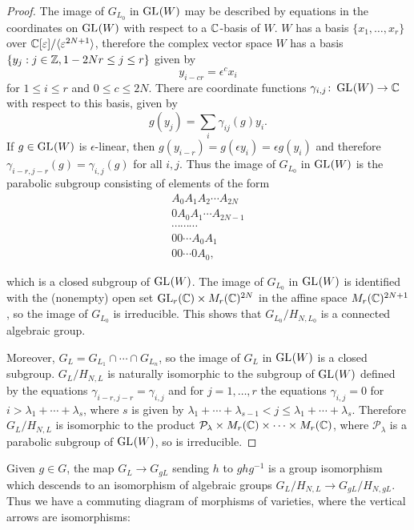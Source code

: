 \documentclass[a4paper, 11pt]{report}
\begin{document}
\begin{proof}
The image of $G_{L_0}$ in $\operatorname{GL}_{}(W)$ may be described by equations in the coordinates on $\operatorname{GL}_{}(W)$ with respect to a $\mathbb{C}$-basis of $W$. $W$ has a basis $\{x_1,\ldots,x_r\}$ over $\mathbb{C}[\varepsilon]/{\langle\varepsilon^{2N+1}\rangle}$, therefore the complex vector space $W$ has a basis $\{y_j:j\in\mathbb{Z},1-2Nr\le j\le r\}$ given by
\begin{equation*}
y_{i-cr} = \epsilon^c x_i
\end{equation*}
for $1\le i\le r$ and $0\le c\le 2N$. There are coordinate functions $\gamma_{i,j}\colon\operatorname{GL}_{}(W)\to\mathbb{C}$ with respect to this basis, given by
\begin{equation*}
g(y_j) = \sum_i \gamma_{ij}(g)y_i.
\end{equation*}
If $g\in\operatorname{GL}_{}(W)$ is $\epsilon$-linear, then $g(y_{i-r}) = g(\epsilon y_i) = \epsilon g(y_i)$ and therefore $\gamma_{i-r,j-r}(g) = \gamma_{i,j}(g)$ for all $i,j$. Thus the image of $G_{L_0}$ in $\operatorname{GL}_{}(W)$ is the parabolic subgroup consisting of elements of the form
\begin{align*}
A_0 A_1 A_2 \cdots A_{2N}\\
0 A_0 A_1 \cdots A_{2N-1}\\
\cdots \cdots \cdots\\
0 0 \cdots A_0 A_1\\
0 0 \cdots 0 A_0,
\end{align*}

which is a closed subgroup of $\operatorname{GL}_{}(W)$. The image of $G_{L_0}$ in $\operatorname{GL}_{}(W)$ is identified with the (nonempty) open set $\operatorname{GL}_{r}(\mathbb{C})\times M_r(\mathbb{C})^{2N}$ in the affine space $M_r(\mathbb{C})^{2N+1}$, so the image of $G_{L_0}$ is irreducible. This shows that $G_{L_0}/{H_{N,L_0}}$ is a connected algebraic group.

Moreover, $G_L = G_{L_1}\cap\cdots\cap G_{L_n}$, so the image of $G_L$ in $\operatorname{GL}_{}(W)$ is a closed subgroup. $G_L/{H_{N,L}}$ is naturally isomorphic to the subgroup of $\operatorname{GL}_{}(W)$ defined by the equations $\gamma_{i-r,j-r} = \gamma_{i,j}$ and for $j=1,\ldots,r$ the equations $\gamma_{i,j}=0$ for $i>\lambda_1+\cdots +\lambda_s$, where $s$ is given by $\lambda_1+\cdots +\lambda_{s-1}< j\le\lambda_1+\cdots +\lambda_s$. Therefore $G_L/{H_{N,L}}$ is isomorphic to the product $\mathcal{P}_\lambda\times M_r(\mathbb{C})\times\cdots\times M_r(\mathbb{C})$, where $\mathcal{P}_\lambda$ is a parabolic subgroup of $\operatorname{GL}_{}(W)$, so is irreducible.
\end{proof}

Given $g\in G$, the map $G_L\to G_{gL}$ sending $h$ to $ghg^{-1}$ is a group isomorphism which descends to an isomorphism of algebraic groups $G_L/{H_{N,L}}\to G_{gL}/{H_{N,gL}}$. Thus we have a commuting diagram of morphisms of varieties, where the vertical arrows are isomorphisms:
\end{document}
